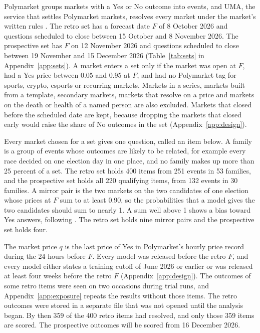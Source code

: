 \documentclass[11pt]{article}
\begin{document}
Polymarket groups markets with a Yes or No outcome into events, and UMA, the service that settles Polymarket markets, resolves every market under the market's written rules \citep{polymarket2026docs}. The retro set has a forecast date $F$ of 8 October 2026 and questions scheduled to close between 15 October and 8 November 2026. The prospective set has $F$ on 12 November 2026 and questions scheduled to close between 19 November and 15 December 2026 (Table~\ref{tab:sets} in Appendix~\ref{app:sets}). A market enters a set only if the market was open at $F$, had a Yes price between 0.05 and 0.95 at $F$, and had no Polymarket tag for sports, crypto, esports or recurring markets. Markets in a series, markets built from a template, secondary markets, markets that resolve on a price and markets on the death or health of a named person are also excluded. Markets that closed before the scheduled date are kept, because dropping the markets that closed early would raise the share of No outcomes in the set (Appendix~\ref{app:design}).

Every market chosen for a set gives one question, called an item below. A family is a group of events whose outcomes are likely to be related, for example every race decided on one election day in one place, and no family makes up more than 25 percent of a set. The retro set holds 400 items from 251 events in 53 families, and the prospective set holds all 220 qualifying items, from 132 events in 30 families. A mirror pair is the two markets on the two candidates of one election whose prices at $F$ sum to at least 0.90, so the probabilities that a model gives the two candidates should sum to nearly 1. A sum well above 1 shows a bias toward Yes answers, following \citet{schoenegger2024}. The retro set holds nine mirror pairs and the prospective set holds four.

The market price $q$ is the last price of Yes in Polymarket's hourly price record during the 24 hours before $F$. Every model was released before the retro $F$, and every model either states a training cutoff of June 2026 or earlier or was released at least four weeks before the retro $F$ (Appendix~\ref{app:design}). The outcomes of some retro items were seen on two occasions during trial runs, and Appendix~\ref{app:exposure} repeats the results without those items. The retro outcomes were stored in a separate file that was not opened until the analysis began. By then 359 of the 400 retro items had resolved, and only those 359 items are scored. The prospective outcomes will be scored from 16 December 2026.
\end{document}
